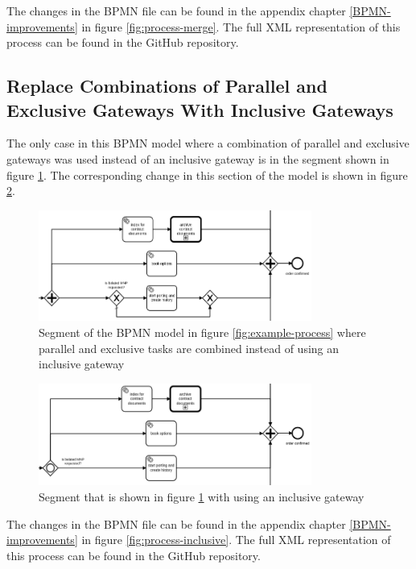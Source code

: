 The changes in the BPMN file can be found in the appendix chapter \ref{BPMN-improvements} in figure \ref{fig:process-merge}. The full XML representation of this process can be found in the GitHub repository\cite{appendix-registration-4}.

\subsection{Replace Combinations of Parallel and Exclusive Gateways With Inclusive Gateways}
The only case in this BPMN model where a combination of parallel and exclusive gateways was used instead of an inclusive gateway is in the segment shown in figure \ref{fig:exclusive-org}. The corresponding change in this section of the model is shown in figure \ref{fig:exclusive-new}. 


\begin{figure}[H]
	\centering
	\includegraphics[width=0.8\textwidth]{graphics/case-study-exclusive-org}
	\caption{Segment of the BPMN model in figure \ref{fig:example-process} where parallel and exclusive tasks are combined instead of using an inclusive gateway}
	\label{fig:exclusive-org}
\end{figure}
\begin{figure}[H]
	\centering
	\includegraphics[width=0.8\textwidth]{graphics/case-study-exclusive-new}
	\caption{Segment that is shown in figure \ref{fig:exclusive-org} with using an inclusive gateway}
	\label{fig:exclusive-new}
\end{figure}

The changes in the BPMN file can be found in the appendix chapter \ref{BPMN-improvements} in figure \ref{fig:process-inclusive}. The full XML representation of this process can be found in the GitHub repository\cite{appendix-registration-5}.
